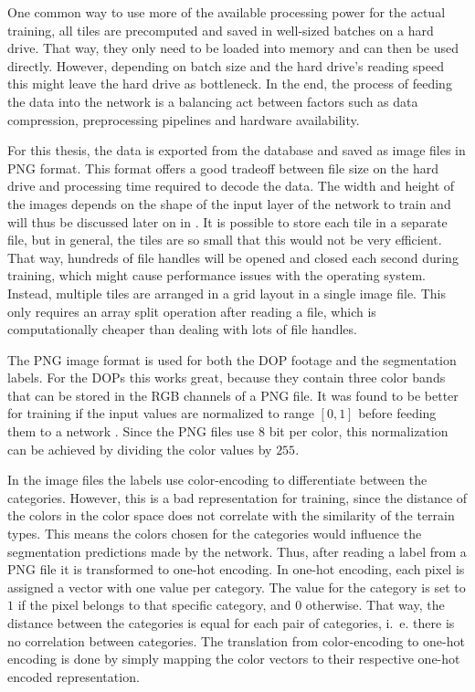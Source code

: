 One common way to use more of the available processing power for the actual training, all tiles are precomputed and saved in well-sized batches on a hard drive. That way, they only need to be loaded into memory and can then be used directly. However, depending on batch size and the hard drive's reading speed this might leave the hard drive as bottleneck. In the end, the process of feeding the data into the network is a balancing act between factors such as data compression, preprocessing pipelines and hardware availability.

For this thesis, the data is exported from the database and saved as image files in PNG format. This format offers a good tradeoff between file size on the hard drive and processing time required to decode the data. The width and height of the images depends on the shape of the input layer of the network to train and will thus be discussed later on in . It is possible to store each tile in a separate file, but in general, the tiles are so small that this would not be very efficient. That way, hundreds of file handles will be opened and closed each second during training, which might cause performance issues with the operating system. Instead, multiple tiles are arranged in a grid layout in a single image file. This only requires an array split operation after reading a file, which is computationally cheaper than dealing with lots of file handles.

The PNG image format is used for both the DOP footage and the segmentation labels. For the DOPs this works great, because they contain three color bands that can be stored in the RGB channels of a PNG file. It was found to be better for training if the input values are normalized to range $[0, 1]$ before feeding them to a network . Since the PNG files use 8 bit per color, this normalization can be achieved by dividing the color values by $255$.

In the image files the labels use color-encoding to differentiate between the categories. However, this is a bad representation for training, since the distance of the colors in the color space does not correlate with the similarity of the terrain types. This means the colors chosen for the categories would influence the segmentation predictions made by the network. Thus, after reading a label from a PNG file it is transformed to one-hot encoding. In one-hot encoding, each pixel is assigned a vector with one value per category. The value for the category is set to $1$ if the pixel belongs to that specific category, and $0$ otherwise. That way, the distance between the categories is equal for each pair of categories, i.~e. there is no correlation between categories. The translation from color-encoding to one-hot encoding is done by simply mapping the color vectors to their respective one-hot encoded representation.



